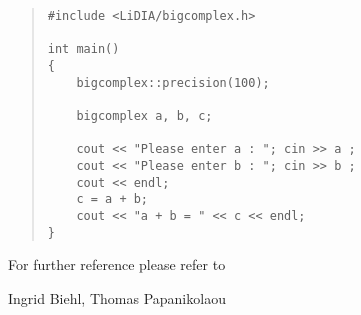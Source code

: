 
\EXAMPLES

\begin{quote}
\begin{verbatim}
#include <LiDIA/bigcomplex.h>

int main()
{
    bigcomplex::precision(100);

    bigcomplex a, b, c;

    cout << "Please enter a : "; cin >> a ;
    cout << "Please enter b : "; cin >> b ;
    cout << endl;
    c = a + b;
    cout << "a + b = " << c << endl;
}
\end{verbatim}
\end{quote}

For further reference please refer to 



\AUTHOR

Ingrid Biehl, Thomas Papanikolaou
